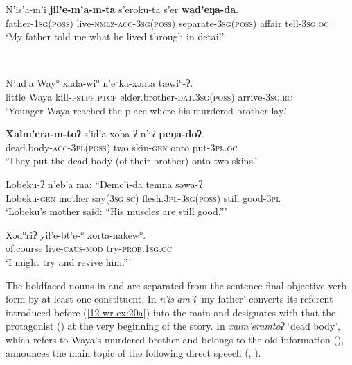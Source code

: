 \documentclass[output=paper]{LSP/langsci}
\begin{document}
\ex \label{12-wr-ex:20d}
\gll N'is'a-m'i \textbf{jil'e-m'a-m-ta} s'eroku-ta s'er \textbf{wad'eŋa-da}.\\
father-\textsc{1sg(poss)} live-\textsc{nmlz-acc-3sg(poss)} separate-\textsc{3sg(poss)} affair tell\textsc{-3sg.oc}\\
\glt ‘My father told me what he lived through in detail’
\z
\z

\ea \label{12-wr-ex:21} 
\\
\ea\label{12-wr-ex:21a} 

\gll N’ud’a Way° xada-wi° n’e°ka-xǝnta tæwi°-ʔ.\\
little Waya kill-\textsc{pstpf.ptcp} elder.brother-\textsc{dat.3sg(poss)} arrive-\textsc{3sg.rc}\\
\glt ‘Younger Waya reached the place where his murdered brother lay.’ %

\ex\label{12-wr-ex:21b} 

\gll \textbf{Xalm’era-m-toʔ} s'id’a xoba-ʔ n’iʔ \textbf{peŋa-doʔ}.\\
dead.body-\textsc{acc-3pl(poss)} two skin\textsc{-gen} onto put\textsc{-3pl.oc}\\
\glt ‘They put the dead body (of their brother) onto two skins.’ %

\ex\label{12-wr-ex:21c} 
\gll Lobeku-ʔ n’eb’a ma: “Ŋemc’i-da temna səwa-ʔ.\\
Lobeku-\textsc{gen} mother say\textsc{(3sg.sc)} flesh.\textsc{3pl-3sg(poss)} still good-\textsc{3pl}\\
\glt ‘Lobeku’s mother said: “His muscles are still good.”’ %

\ex\label{12-wr-ex:21d} 
\gll Xəd°riʔ yil’e-bt’e-° xorta-nakew°.\\
of.course live-\textsc{caus-mod} try-\textsc{prob.1sg.oc}\\
\glt ‘I might try and revive him.”’ %
\z
\z

The boldfaced  nouns in  and  are separated from the sentence-final objective verb form by at least one constituent. 
In  \textit{n’is’am’i} ‘my father’ converts its referent introduced before (\cf \ref{12-wr-ex:20a}) into the main  and designates with that the protagonist (\cf {}) at the very beginning of the story. 
In  \textit{xalm’eramtoʔ} ‘dead body’, which refers to Waya’s murdered brother and belongs to the old information (\cf {}), announces the main topic of the following direct speech (\cf {}, ). 
\end{document}
